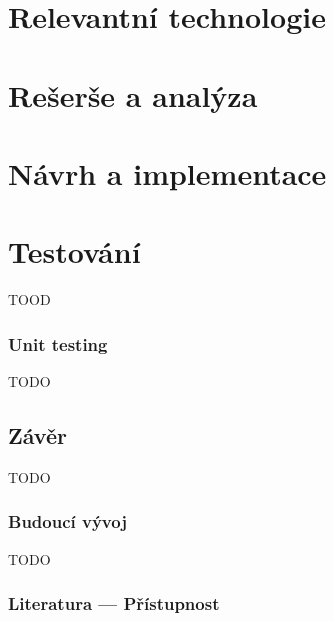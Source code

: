 \documentclass{ctuthesis}
\begin{document}
\maketitle



\part{Relevantní technologie}




\part{Rešerše a analýza}




\part{Návrh a implementace}




\part{Testování}

TOOD

\section{Unit testing}

TODO

\chapter{Závěr}

TODO

\section{Budoucí vývoj}

TODO

\appendix

\printbibliography[title={Seznam literatury}]

\section{Literatura --- Přístupnost}
\end{document}
